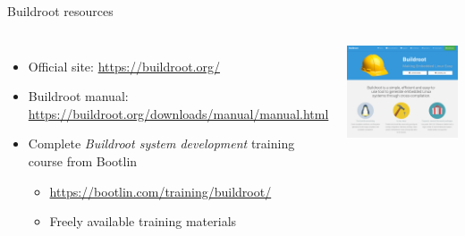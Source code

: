 \begin{frame}{Buildroot resources}
  \begin{columns}
    \begin{itemize}
    \item Official site: \url{https://buildroot.org/}
    \item Buildroot manual: \url{https://buildroot.org/downloads/manual/manual.html}
    \item Complete {\em Buildroot system development} training course
      from Bootlin
      \begin{itemize}
      \item \url{https://bootlin.com/training/buildroot/}
      \item Freely available training materials
      \end{itemize}
    \end{itemize}
    \begin{center}
      \includegraphics[height=0.4\textheight]{slides/sysdev-build-systems/br-site.png}\\

\end{center}
\end{columns}
\end{frame}
